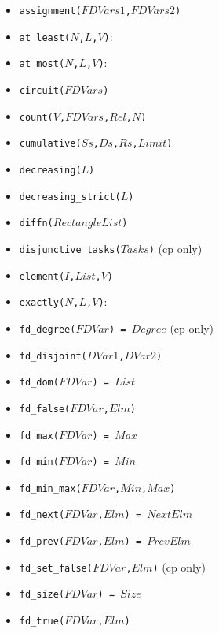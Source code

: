 \documentclass[10pt]{article}
\begin{document}
\begin{multicols}{2}
\begin{scriptsize}
\begin{itemize}
\item \texttt{assignment($FDVars1$,$FDVars2$)}
\item \texttt{at\_least($N$,$L$,$V$)}:
\item \texttt{at\_most($N$,$L$,$V$)}: 
\item \texttt{circuit($FDVars$)}
\item \texttt{count($V$,$FDVars$,$Rel$,$N$)}
\item \texttt{cumulative($Ss$,$Ds$,$Rs$,$Limit$)}
\item \texttt{decreasing($L$)}
\item \texttt{decreasing\_strict($L$)}
\item \texttt{diffn($RectangleList$)}
\item \texttt{disjunctive\_tasks($Tasks$)} (cp only)
\item \texttt{element($I$,$List$,$V$)}
\item \texttt{exactly($N$,$L$,$V$)}:
\item \texttt{fd\_degree($FDVar$) = $Degree$} (cp only)
\item \texttt{fd\_disjoint($DVar1$,$DVar2$)} 
\item \texttt{fd\_dom($FDVar$) = $List$}
\item \texttt{fd\_false($FDVar$,$Elm$)}
\item \texttt{fd\_max($FDVar$) = $Max$}
\item \texttt{fd\_min($FDVar$) = $Min$}
\item \texttt{fd\_min\_max($FDVar$,$Min$,$Max$)}
\item \texttt{fd\_next($FDVar$,$Elm$) = $NextElm$}
\item \texttt{fd\_prev($FDVar$,$Elm$) = $PrevElm$}
\item \texttt{fd\_set\_false($FDVar$,$Elm$)} (cp only)
\item \texttt{fd\_size($FDVar$) = $Size$}
\item \texttt{fd\_true($FDVar$,$Elm$)}

\end{itemize}
\end{scriptsize}
\end{multicols}
\end{document}

